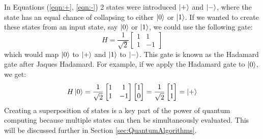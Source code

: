 \documentclass[reqno]{amsart}
\numberwithin{equation}{section}
\numberwithin{figure}{section}
\begin{document}
\begin{justify}
In Equations (\ref{eqn:+}, \ref{eqn:-}) 2 states were introduced $\ket{+}$ and $\ket{-}$, where the state has an equal chance of collapsing to either $\ket{0}$ or $\ket{1}$. If we wanted to create these states from an input state, say $\ket{0}$ or $\ket{1}$, we could use the following gate:
    \begin{equation}
        H = \frac{1}{\sqrt{2}}\begin{bmatrix}
                                1 & 1 \\
                                1 & -1
                            \end{bmatrix}
    \end{equation}
    which would map $\ket{0}$ to $\ket{+}$ and $\ket{1}$ to $\ket{-}$. This gate is known as the Hadamard gate after Jaques Hadamard. \cite{Hadamard1893} For example, if we apply the Hadamard gate to $\ket{0}$, we get:
    \begin{equation}
        H\ket{0} = \frac{1}{\sqrt{2}}\begin{bmatrix}
                                        1 & 1 \\
                                        1 & -1
                                    \end{bmatrix}\begin{bmatrix}
                                                    1 \\
                                                    0
                                                \end{bmatrix} = \frac{1}{\sqrt{2}}\begin{bmatrix}
                                                                                    1 \\
                                                                                    1
                                                                                \end{bmatrix} = \ket{+}
    \end{equation}
Creating a superposition of states is a key part of the power of quantum computing because multiple states can then be simultaneously evaluated. This will be discussed further in Section \ref{sec:QuantumAlgorithms}. \\


\end{justify}
\end{document}
